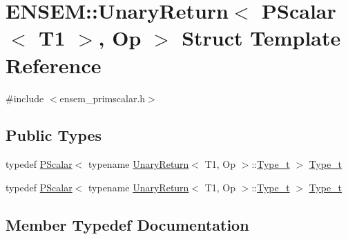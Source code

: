 \hypertarget{structENSEM_1_1UnaryReturn_3_01PScalar_3_01T1_01_4_00_01Op_01_4}{}\section{E\+N\+S\+EM\+:\+:Unary\+Return$<$ P\+Scalar$<$ T1 $>$, Op $>$ Struct Template Reference}
\label{structENSEM_1_1UnaryReturn_3_01PScalar_3_01T1_01_4_00_01Op_01_4}


{\ttfamily \#include $<$ensem\+\_\+primscalar.\+h$>$}

\subsection*{Public Types}
\begin{DoxyCompactItemize}
\item 
typedef \mbox{\hyperlink{classENSEM_1_1PScalar}{P\+Scalar}}$<$ typename \mbox{\hyperlink{structENSEM_1_1UnaryReturn}{Unary\+Return}}$<$ T1, Op $>$\+::\mbox{\hyperlink{structENSEM_1_1UnaryReturn_3_01PScalar_3_01T1_01_4_00_01Op_01_4_a75130a6bdc9f60586c1614ed4177aa96}{Type\+\_\+t}} $>$ \mbox{\hyperlink{structENSEM_1_1UnaryReturn_3_01PScalar_3_01T1_01_4_00_01Op_01_4_a75130a6bdc9f60586c1614ed4177aa96}{Type\+\_\+t}}
\item 
typedef \mbox{\hyperlink{classENSEM_1_1PScalar}{P\+Scalar}}$<$ typename \mbox{\hyperlink{structENSEM_1_1UnaryReturn}{Unary\+Return}}$<$ T1, Op $>$\+::\mbox{\hyperlink{structENSEM_1_1UnaryReturn_3_01PScalar_3_01T1_01_4_00_01Op_01_4_a75130a6bdc9f60586c1614ed4177aa96}{Type\+\_\+t}} $>$ \mbox{\hyperlink{structENSEM_1_1UnaryReturn_3_01PScalar_3_01T1_01_4_00_01Op_01_4_a75130a6bdc9f60586c1614ed4177aa96}{Type\+\_\+t}}
\end{DoxyCompactItemize}


\subsection{Member Typedef Documentation}
\mbox{\label{structENSEM_1_1UnaryReturn_3_01PScalar_3_01T1_01_4_00_01Op_01_4_a75130a6bdc9f60586c1614ed4177aa96}} 
